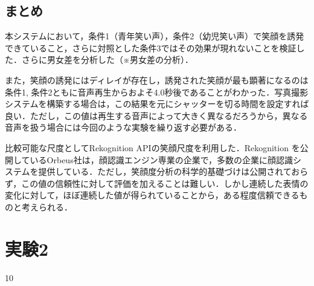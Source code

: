 \documentclass[submit,techreq]{ec2014}
\def\|{\verb|}
\begin{document}
\subsection{まとめ}

本システムにおいて，条件1（青年笑い声），条件2（幼児笑い声）で笑顔を誘発できていること，さらに対照とした条件3ではその効果が現れないことを検証した．さらに男女差を分析した（※男女差の分析）．

また，笑顔の誘発にはディレイが存在し，誘発された笑顔が最も顕著になるのは条件1, 条件2ともに音声再生からおよそ4.0秒後であることがわかった．写真撮影システムを構築する場合は，この結果を元にシャッターを切る時間を設定すれば良い．ただし，この値は再生する音声によって大きく異なるだろうから，異なる音声を扱う場合には今回のような実験を繰り返す必要がある．

比較可能な尺度としてRekognition APIの笑顔尺度を利用した．Rekognition を公開しているOrbeus社は，顔認識エンジン専業の企業で，多数の企業に顔認識システムを提供している．ただし，笑顔度分析の科学的基礎づけは公開されておらず，この値の信頼性に対して評価を加えることは難しい．しかし連続した表情の変化に対して，ほぼ連続した値が得られていることから，ある程度信頼できるものと考えられる．

\section{実験2}



\begin{thebibliography}{10}

\end{thebibliography}



%\pagebreak%%!!!
%\vspace*{-\baselineskip}%%!!!

%\appendix
%7
%\section{付録の書き方}

%付録がある場合には，参考文献リストの直後にコマンド \|\appendix| に引き続

\end{document}
